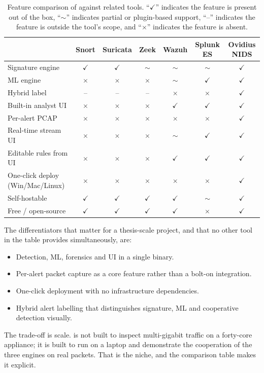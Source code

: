 \begin{table}[h]
\centering
\small
\caption{Feature comparison of \nidsname{} against related tools.
``$\checkmark$'' indicates the feature is present out of the box,
``$\sim$'' indicates partial or plugin-based support, ``--''
indicates the feature is outside the tool's scope, and ``$\times$''
indicates the feature is absent.}
\label{tab:positioning}
\begin{tabular}{l c c c c c c}
\toprule
                              & Snort & Suricata & Zeek & Wazuh & Splunk ES & \textbf{Ovidius NIDS} \\
\midrule
Signature engine              & $\checkmark$ & $\checkmark$ & $\sim$ & $\sim$  & $\sim$  & $\checkmark$ \\
ML engine                     & $\times$     & $\times$     & $\times$ & $\sim$  & $\checkmark$ & $\checkmark$ \\
Hybrid label                  & --           & --           & --     & $\times$ & $\times$ & $\checkmark$ \\
Built-in analyst UI           & $\times$     & $\times$     & $\times$ & $\checkmark$ & $\checkmark$ & $\checkmark$ \\
Per-alert PCAP                & $\times$     & $\times$     & $\times$ & $\times$ & $\times$ & $\checkmark$ \\
Real-time stream UI           & $\times$     & $\times$     & $\times$ & $\sim$   & $\checkmark$ & $\checkmark$ \\
Editable rules from UI        & $\times$     & $\times$     & $\times$ & $\checkmark$ & $\checkmark$ & $\checkmark$ \\
One-click deploy (Win/Mac/Linux)& $\times$   & $\times$     & $\times$ & $\times$ & $\times$ & $\checkmark$ \\
Self-hostable                 & $\checkmark$ & $\checkmark$ & $\checkmark$ & $\checkmark$ & $\sim$ & $\checkmark$ \\
Free / open-source            & $\checkmark$ & $\checkmark$ & $\checkmark$ & $\checkmark$ & $\times$ & $\checkmark$ \\
\bottomrule
\end{tabular}
\end{table}

The differentiators that matter for a thesis-scale project, and that
no other tool in the table provides simultaneously, are:

\begin{itemize}
  \item Detection, ML, forensics and UI in a single binary.
  \item Per-alert packet capture as a core feature rather than a
    bolt-on integration.
  \item One-click deployment with no infrastructure dependencies.
  \item Hybrid alert labelling that distinguishes signature, ML and
    cooperative detection visually.
\end{itemize}

The trade-off is scale. \nidsname{} is not built to inspect
multi-gigabit traffic on a forty-core appliance; it is built to
run on a laptop and demonstrate the cooperation of the three
engines on real packets. That is the niche, and the comparison
table makes it explicit.
